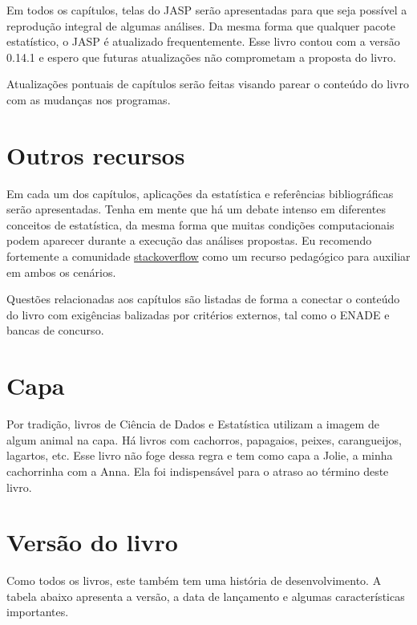 \documentclass[
]{book}
\begin{document}
Em todos os capítulos, telas do JASP serão apresentadas para que seja possível a reprodução integral de algumas análises. Da mesma forma que qualquer pacote estatístico, o JASP é atualizado frequentemente. Esse livro contou com a versão 0.14.1 e espero que futuras atualizações não comprometam a proposta do livro.

Atualizações pontuais de capítulos serão feitas visando parear o conteúdo do livro com as mudanças nos programas.

\hypertarget{outros-recursos}{%
\section{Outros recursos}\label{outros-recursos}}

Em cada um dos capítulos, aplicações da estatística e referências bibliográficas serão apresentadas. Tenha em mente que há um debate intenso em diferentes conceitos de estatística, da mesma forma que muitas condições computacionais podem aparecer durante a execução das análises propostas. Eu recomendo fortemente a comunidade \href{https://stackoverflow.com/}{stackoverflow} como um recurso pedagógico para auxiliar em ambos os cenários.

Questões relacionadas aos capítulos são listadas de forma a conectar o conteúdo do livro com exigências balizadas por critérios externos, tal como o ENADE e bancas de concurso.

\hypertarget{capa}{%
\section{Capa}\label{capa}}

Por tradição, livros de Ciência de Dados e Estatística utilizam a imagem de algum animal na capa. Há livros com cachorros, papagaios, peixes, carangueijos, lagartos, etc. Esse livro não foge dessa regra e tem como capa a Jolie, a minha cachorrinha com a Anna. Ela foi indispensável para o atraso ao término deste livro.

\hypertarget{versuxe3o-do-livro}{%
\section{Versão do livro}\label{versuxe3o-do-livro}}

Como todos os livros, este também tem uma história de desenvolvimento. A tabela abaixo apresenta a versão, a data de lançamento e algumas características importantes.
\end{document}
